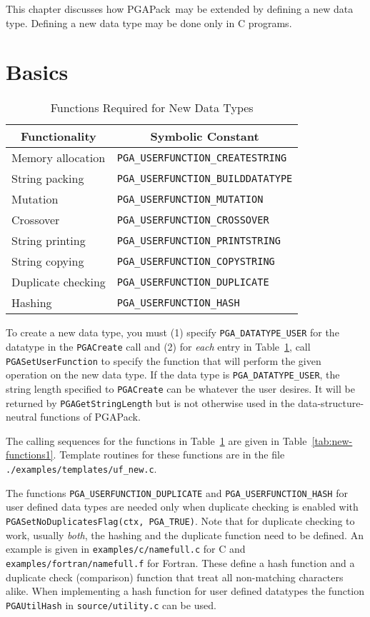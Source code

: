 \documentclass{report}
\newcommand{\pga}{PGAPack}
\begin{document}
This chapter discusses how \pga\ may be extended by defining a new data type.
Defining a new data type may be done  only in C programs.

\section{Basics}

\begin{table}
\centering
\caption
{
Functions Required for New Data Types\label{tab:new-functions}
}
\begin{tabular}{|l|l|} \hline\hline
\multicolumn{1}{|c|}{Functionality} &
\multicolumn{1}{c|}{Symbolic Constant} \\ \hline
Memory allocation & \verb+PGA_USERFUNCTION_CREATESTRING+ \\
String packing & \verb+PGA_USERFUNCTION_BUILDDATATYPE+ \\
Mutation & \verb+PGA_USERFUNCTION_MUTATION+ \\
Crossover & \verb+PGA_USERFUNCTION_CROSSOVER+ \\
String printing & \verb+PGA_USERFUNCTION_PRINTSTRING+ \\
String copying & \verb+PGA_USERFUNCTION_COPYSTRING+ \\
Duplicate checking & \verb+PGA_USERFUNCTION_DUPLICATE+ \\
Hashing & \verb+PGA_USERFUNCTION_HASH+ \\
\hline
\end{tabular}
\end{table}

To create a new data type, you must (1) specify \verb+PGA_DATATYPE_USER+ for
the datatype in the \verb+PGACreate+ call and (2) for {\em each} entry in
Table~\ref{tab:new-functions}, call \verb+PGASetUserFunction+ to specify the
function that will perform the given operation on the new data type.  If the
data type is \verb+PGA_DATATYPE_USER+, the string length specified to
\verb+PGACreate+ can be whatever the user desires.  It will be returned by
\verb+PGAGetStringLength+ but is not otherwise used in the
data-structure-neutral functions of \pga.

The calling sequences for the functions in Table~\ref{tab:new-functions} are
given in Table~\ref{tab:new-functions1}. Template routines for these functions
are in the file \verb+./examples/templates/uf_new.c+.

The functions \verb+PGA_USERFUNCTION_DUPLICATE+ and
\verb+PGA_USERFUNCTION_HASH+ for user defined data types are needed only
when duplicate checking is enabled with
\verb+PGASetNoDuplicatesFlag(ctx, PGA_TRUE)+. Note that for duplicate
checking to work, usually \textit{both}, the hashing and the duplicate
function need to be defined. An example is given in
\verb+examples/c/namefull.c+ for C and
\verb+examples/fortran/namefull.f+ for Fortran. These define a hash
function and a duplicate check (comparison) function that treat all
non-matching characters alike. When implementing a hash function for
user defined datatypes the function \verb+PGAUtilHash+ in
\verb+source/utility.c+ can be used.
\end{document}
